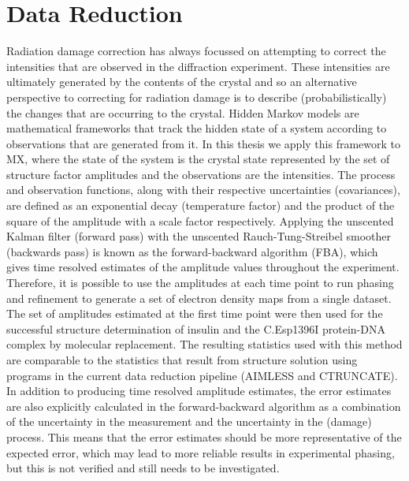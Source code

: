 \section{Data Reduction}
\label{sec:Data Reduction}
Radiation damage correction has always focussed on attempting to correct the intensities that are observed in the diffraction experiment.
These intensities are ultimately generated by the contents of the crystal and so an alternative perspective to correcting for radiation damage is to describe (probabilistically) the changes that are occurring to the crystal.
Hidden Markov models are mathematical frameworks that track the hidden state of a system according to observations that are generated from it.
In this thesis we apply this framework to MX, where the state of the system is the crystal state represented by the set of structure factor amplitudes and the observations are the intensities.
The process and observation functions, along with their respective uncertainties (covariances), are defined as an exponential decay (temperature factor) and the product of the square of the amplitude with a scale factor respectively.
Applying the unscented Kalman filter (forward pass) with the unscented Rauch-Tung-Streibel smoother (backwards pass) is known as the forward-backward algorithm (FBA), which gives time resolved estimates of the amplitude values throughout the experiment.
Therefore, it is possible to use the amplitudes at each time point to run phasing and refinement to generate a set of electron density maps from a single dataset.
The set of amplitudes estimated at the first time point were then used for the successful structure determination of insulin and the C.Esp1396I protein-DNA complex by molecular replacement.
The resulting statistics used with this method are comparable to the statistics that result from structure solution using programs in the current data reduction pipeline (AIMLESS and CTRUNCATE).
In addition to producing time resolved amplitude estimates, the error estimates are also explicitly calculated in the forward-backward algorithm as a combination of the uncertainty in the measurement and the uncertainty in the (damage) process.
This means that the error estimates should be more representative of the expected error, which may lead to more reliable results in experimental phasing, but this is not verified and still needs to be investigated.

